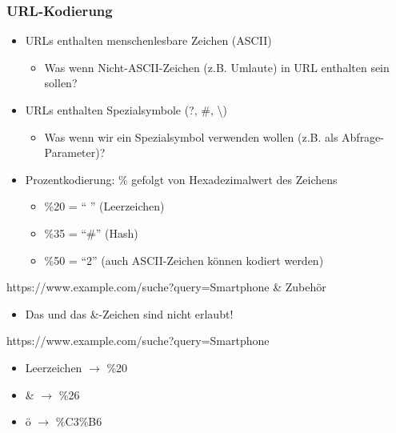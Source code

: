 \subsubsection*{URL-Kodierung}
\begin{itemize}
    \item URLs enthalten menschenlesbare Zeichen (ASCII)
    \begin{itemize}
        \item Was wenn Nicht-ASCII-Zeichen (z.B. Umlaute) in URL enthalten sein sollen?
    \end{itemize}
    \item URLs enthalten Spezialsymbole (?, \#, \textbackslash)
    \begin{itemize}
        \item Was wenn wir ein Spezialsymbol verwenden wollen (z.B. als Abfrage-Parameter)?
    \end{itemize}
\end{itemize}
\underline{}
\begin{itemize}
    \item Prozentkodierung: \% gefolgt von Hexadezimalwert des Zeichens
    \begin{itemize}
        \item \%20 = \enquote{ } (Leerzeichen)
        \item \%35 = \enquote{\#} (Hash)
        \item \%50  = \enquote{2} (auch ASCII-Zeichen können kodiert werden)
    \end{itemize}
\end{itemize}
\begin{infoBox}[title=Beispiel für URL-Kodierung]
    \begin{codeBlock}{}
        https://www.example.com/suche?query=Smartphone & Zubehör
    \end{codeBlock}
    \begin{itemize}
        \item Das  und das \&-Zeichen sind nicht erlaubt!
    \end{itemize}
    \begin{codeBlock}{}
        https://www.example.com/suche?query=Smartphone%
    \end{codeBlock}
    \begin{itemize}
        \item Leerzeichen $\rightarrow$ \%20
        \item \& $\rightarrow$ \%26
        \item ö $\rightarrow$ \%C3\%B6
    \end{itemize}
\end{infoBox}
